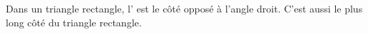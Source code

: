 Dans un triangle rectangle, l' est le côté opposé à
l'angle droit. C'est aussi le plus long côté du triangle rectangle.